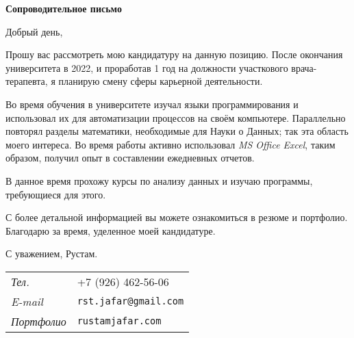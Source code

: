 \documentclass[12pt,a4paper]{article}
\begin{document}
\begin{center}
    \Large \textbf{Сопроводительное письмо}
    \vspace{15pt}
\end{center}

    Добрый день, \par
    \vspace{10pt}
    Прошу вас рассмотреть мою кандидатуру на данную позицию. После окончания
    университета в 2022, и проработав 1 год на должности участкового
    врача-терапевта, я планирую смену сферы карьерной деятельности. \par
    \vspace{10pt}
    Во время обучения в университете изучал языки программирования и использовал 
    их для автоматизации процессов на своём компьютере. Параллельно повторял 
    разделы математики, необходимые для Науки о Данных; так эта 
    область моего интереса. Во время работы активно использовал 
    \textit{MS Office Excel}, таким образом, получил опыт в составлении 
    ежедневных отчетов. \par
    \vspace{10pt}
    В данное время прохожу курсы по анализу данных и изучаю программы, требующиеся для этого. \par
    \vspace{10pt}
    С более детальной информацией вы можете ознакомиться в резюме и портфолио. Благодарю за время, уделенное моей кандидатуре. \par
    \vspace{10pt}
    С уважением, Рустам. \par
    \vspace{2pt}
    \begin{tabular}{@{}l >{\quad}l}
        \textit{Тел.} & +7 (926) 462-56-06 \\
        \textit{E-mail} & \texttt{rst.jafar@gmail.com} \\
        \textit{Портфолио} & \texttt{rustamjafar.com}
    \end{tabular}
\end{document}
